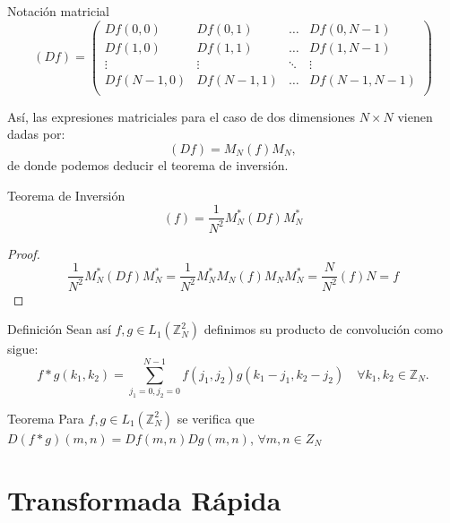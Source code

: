 \documentclass[11pt,compress]{beamer}
\newcommand\Z{\mathbb{Z}}
\begin{document}
\begin{frame}
\begin{block}{Notación matricial}
\[
    (Df) = \begin{pmatrix}
    Df(0,0) & Df(0,1) & \dots & Df(0,N-1) \\
    Df(1,0) & Df(1,1) & \dots & Df(1,N-1) \\
    \vdots & \vdots & \ddots & \vdots \\
    Df(N-1,0) & Df(N-1,1) & \dots & Df(N-1,N-1) \\
    \end{pmatrix}
\]
\end{block}
\end{frame}

\begin{frame}
Así, las expresiones matriciales para el caso de dos dimensiones $N \times N$ vienen dadas por:
\[
    (Df) = M_N (f) M_N ,
\]
de donde podemos deducir el teorema de inversión.
\begin{alertblock}{Teorema de Inversión}
\[(f) = \frac{1}{N^2} M_N^{\ast} (Df) M_N^{\ast}\]
\end{alertblock}
\begin{proof}
\[\frac{1}{N^2} M_N^{\ast} (Df) M_N^{\ast}=\frac{1}{N^2} M_N^{\ast} M_N (f) M_N  M_N^{\ast}=\frac{N}{N^2}(f)N=f\]
\end{proof}
\end{frame}


\begin{frame}
\begin{block}{Definición}
Sean así $f,g \in L_1(\Z_{N}^{2})$ definimos su producto de convolución como sigue:
\[
f \ast g(k_1,k_2)=\sum_{j_1=0,j_2=0}^{N-1}f(j_1,j_2)g(k_1-j_1,k_2-j_2) \quad \forall k_1,k_2 \in \Z_N.
\]
\end{block}

\begin{alertblock}{Teorema}
  Para $f,g \in L_1(\Z_{N}^{2})$ se verifica que $D(f \ast g)(m,n)=Df(m,n)Dg(m,n)$, $\forall m,n \in Z_N$
\end{alertblock}
\end{frame}

\section{Transformada Rápida}
\end{document}
